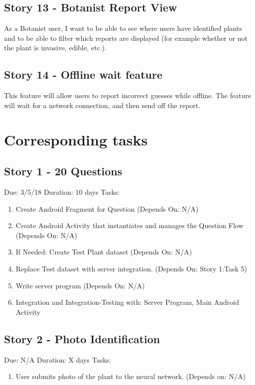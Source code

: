 \documentclass[a4paper]{article}
\begin{document}
\subsection{Story 13 - Botanist Report View}
As a Botanist user, I want to be able to see where users have identified plants and to be able to filter which reports are displayed (for example whether or not the plant is invasive, edible, etc.).
\subsection{Story 14 - Offline wait feature}
This feature will allow users to report incorrect guesses while offline. The feature will wait for a network connection, and then send off the report.
\section{Corresponding tasks}
\subsection{Story 1 - 20 Questions}
Due: 3/5/18
\newline
Duration: 10 days 
\newline
Tasks:
\begin{enumerate}
\item Create Android Fragment for Question (Depends On: N/A)
\item Create Android Activity that instantiates and manages the Question Flow (Depends On: N/A)
\item If Needed: Create Test Plant dataset (Depends On: N/A)
\item Replace Test dataset with server integration. (Depends On: Story 1:Task 5)
\item Write server program (Depends On: N/A)
\item Integration and Integration-Testing with: Server Program, Main Android Activity
\end{enumerate}

\subsection{Story 2 - Photo Identification}
Due: N/A
\newline
Duration: X days 
\newline
Tasks:
\begin{enumerate}
\item User submits photo of the plant to the neural network. (Depends on: N/A)
\end{enumerate}
\end{document}
